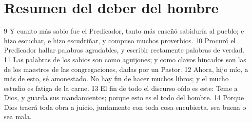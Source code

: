 \section*{Resumen del deber del hombre}

9 Y cuanto más sabio fue el Predicador, tanto más enseñó sabiduría al pueblo; e hizo escuchar, e hizo escudriñar, y compuso muchos proverbios.
10 Procuró el Predicador hallar palabras agradables, y escribir rectamente palabras de verdad.
11 Las palabras de los sabios son como aguijones; y como clavos hincados son las de los maestros de las congregaciones, dadas por un Pastor.
12 Ahora, hijo mío, a más de esto, sé amonestado. No hay fin de hacer muchos libros; y el mucho estudio es fatiga de la carne.
13 El fin de todo el discurso oído es este: Teme a Dios, y guarda sus mandamientos; porque esto es el todo del hombre.
14 Porque Dios traerá toda obra a juicio, juntamente con toda cosa encubierta, sea buena o sea mala.

